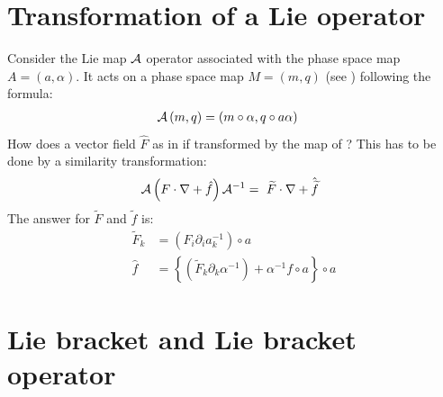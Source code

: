\documentclass[english,12pt,article]{article} %
\begin{document}
{{{\section{Transformation of a  Lie operator}\label{sec:trans} 

Consider the Lie map $\cal A$ operator associated with the phase space map $A=(a,\alpha)$. It acts on a phase space map $M=(m,q)$ (see ) following the formula:
%
\begin{align} {\cal A}\left({m,q}\right)&=\left({m\circ \alpha ,q\circ a\alpha }\right)\label{eq:koopman}\end{align}
How does a vector field $\widehat{F}$ as in  if transformed by the map of ? This has to be done by a similarity transformation:
%
\begin{align} \ {\cal A}\left({F\cdot \nabla +\hat{f}}\right){{\cal A}}^{-1}&=\ \widetilde{F}\cdot \nabla +\hat{\widetilde{f}} \label{aacts}\end{align}
%
The answer for $\widetilde{F}$ and  $\widetilde{f}$ is:
%
\begin{align} {\widetilde{F}}_{k}&=\left({{F}_{i}{\partial }_{i}{a}_{k}^{-1}}\right)\circ a\nonumber \\
 \hat{f}&=\left\{{\left({{\widetilde{F}}_{k}{\partial }_{k}{\alpha }^{-1}}\right)+{\alpha }^{-1}f\circ a}\right\}\circ a \label{eq:transfgrag}\end{align}

\section{Lie bracket and Lie bracket operator}\label{sec:transbracket}

}}}
\end{document}
